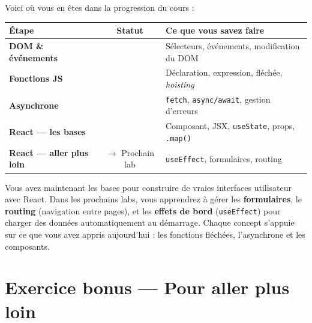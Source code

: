 \documentclass[11pt,a4paper]{article}
\newcommand{\cmark}{\ding{51}}
\begin{document}
Voici où vous en êtes dans la progression du cours :

\begin{center}
\begin{tabular}{lcp{7.5cm}}
\toprule
\textbf{Étape} & \textbf{Statut} & \textbf{Ce que vous savez faire} \\
\midrule
\textbf{DOM \& événements} & \cmark{} & Sélecteurs, événements, modification du DOM \\
\textbf{Fonctions JS} & \cmark{} & Déclaration, expression, fléchée, \emph{hoisting} \\
\textbf{Asynchrone} & \cmark{} & \texttt{fetch}, \texttt{async/await}, gestion d'erreurs \\
\textbf{React --- les bases} & \cmark{} & Composant, JSX, \texttt{useState}, props, \texttt{.map()} \\
\textbf{React --- aller plus loin} & $\to$ Prochain lab & \texttt{useEffect}, formulaires, routing \\
\bottomrule
\end{tabular}
\end{center}

\begin{projetbox}[Et ensuite ?]
Vous avez maintenant les bases pour construire de vraies interfaces utilisateur avec React. Dans les prochains labs, vous apprendrez à gérer les \textbf{formulaires}, le \textbf{routing} (navigation entre pages), et les \textbf{effets de bord} (\texttt{useEffect}) pour charger des données automatiquement au démarrage. Chaque concept s'appuie sur ce que vous avez appris aujourd'hui : les fonctions fléchées, l'asynchrone et les composants.
\end{projetbox}

\section*{Exercice bonus --- Pour aller plus loin}
\end{document}
